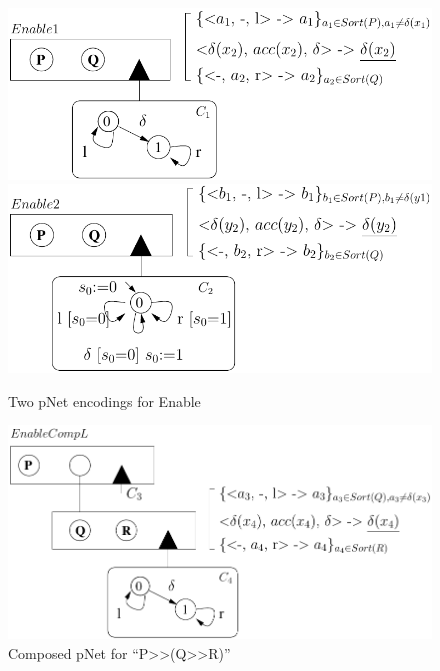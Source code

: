 \documentclass{lncs/llncs}
\begin{document}
\begin{figure}[t]
\begin{minipage}{6.1cm}

  \includegraphics[width=\linewidth]{XFIG/Enable1}
  \\[1.3ex]
 \includegraphics[width=\linewidth]{XFIG/Enable2}
  \caption{Two pNet encodings for  Enable }  \label{schema:enable-pnets}
\end{minipage}
  \hspace{2mm}
\begin{minipage}{6cm}
  \includegraphics[width=\linewidth]{XFIG/P-QR}
  \caption{Composed pNet for ``P>>(Q>>R)''}  \label{schema:enable-composed}
\end{minipage}

\end{figure}
\end{document}
